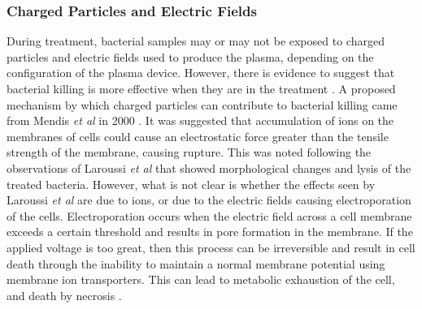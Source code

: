 \documentclass[11pt, oneside]{article}   	%
\begin{document}
\subsubsection{Charged Particles and Electric Fields}
During treatment, bacterial samples may or may not be exposed to charged particles and electric fields used to produce the plasma, depending on the configuration of the plasma device.
However, there is evidence to suggest that bacterial killing is more effective when they are in the treatment \cite{Fridman2007comparison}.
A proposed mechanism by which charged particles can contribute to bacterial killing came from Mendis \textit{et al} in 2000 \cite{Mendis2000a}.
It was suggested that accumulation of ions on the membranes of cells could cause an electrostatic force greater than the tensile strength of the membrane, causing rupture.
This was noted following the observations of Laroussi \textit{et al} \cite{Laroussi1999images} that showed morphological changes and lysis of the treated bacteria.
However, what is not clear is whether the effects seen by Laroussi \textit{et al} are due to ions, or due to the electric fields causing electroporation of the cells.
Electroporation occurs when the electric field across a cell membrane exceeds a certain threshold and results in pore formation in the membrane. If the applied voltage is too great, then this process can be irreversible and result in cell death through the inability to maintain a normal membrane potential using membrane ion transporters. 
This can lead to metabolic exhaustion of the cell, and death by necrosis \cite{Lee2006cell}.
\end{document}
